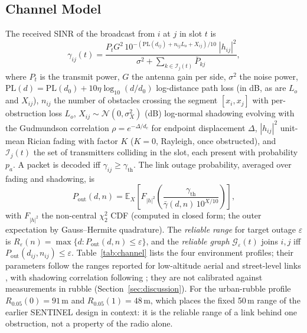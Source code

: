 \subsection{Channel Model}
The received SINR of the broadcast from $i$ at $j$ in slot $t$ is
\begin{equation}
\gamma_{ij}(t)=\frac{P_t G^2\, 10^{-(\mathrm{PL}(d_{ij})+n_{ij}L_o+X_{ij})/10}\; |h_{ij}|^2}
{\sigma^2+\sum_{k\in\mathcal{I}_j(t)}\bar P_{kj}},\label{eq:sinr}
\end{equation}
where $P_t$ is the transmit power, $G$ the antenna gain per side, $\sigma^2$ the noise power,
$\mathrm{PL}(d)=\mathrm{PL}(d_0)+10\eta\log_{10}(d/d_0)$ log-distance path loss (in dB, as are $L_o$ and $X_{ij}$),
$n_{ij}$ the number of obstacles crossing the segment $[x_i,x_j]$ with per-obstruction loss $L_o$,
$X_{ij}\sim\mathcal{N}(0,\sigma_X^2)$ (dB) log-normal shadowing evolving with the Gudmundson
correlation $\rho=e^{-\Delta/d_c}$ for endpoint displacement $\Delta$, $|h_{ij}|^2$ unit-mean
Rician fading with factor $K$ ($K=0$, Rayleigh, once obstructed), and $\mathcal{I}_j(t)$ the set
of transmitters colliding in the slot, each present with probability $p_a$. A packet is decoded
iff $\gamma_{ij}\ge\gamma_{\mathrm{th}}$. The link outage probability, averaged over fading and
shadowing, is
\begin{equation}
P_{\mathrm{out}}(d,n)=\mathbb{E}_X\!\left[F_{|h|^2}\!\left(\frac{\gamma_{\mathrm{th}}}{\bar\gamma(d,n)\,10^{X/10}}\right)\right],
\label{eq:pout}
\end{equation}
with $F_{|h|^2}$ the non-central $\chi^2_2$ CDF (computed in closed form; the outer expectation
by Gauss--Hermite quadrature). The \emph{reliable range} for target outage $\varepsilon$ is
$R_\varepsilon(n)=\max\{d: P_{\mathrm{out}}(d,n)\le\varepsilon\}$, and the \emph{reliable graph}
$\mathcal{G}_\varepsilon(t)$ joins $i,j$ iff $P_{\mathrm{out}}(d_{ij},n_{ij})\le\varepsilon$.
Table~\ref{tab:channel} lists the four environment profiles; their parameters follow the ranges
reported for low-altitude aerial and street-level links \cite{tr36777,itup1411}, with
shadowing correlation following \cite{gudmundson1991}; they are not calibrated against measurements
in rubble (Section~\ref{sec:discussion}). For the urban-rubble profile $R_{0.05}(0)=91$\,m and $R_{0.05}(1)=48$\,m,
which places the fixed 50\,m range of the earlier SENTINEL design in context: it is the
reliable range of a link behind one obstruction, not a property of the radio alone.

